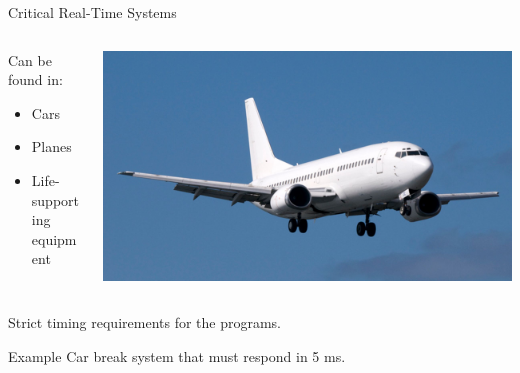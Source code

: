 \documentclass{beamer}
\begin{document}
\begin{frame}{Critical Real-Time Systems}
    \begin{columns}
        \begin{column}{0.5\textwidth}
            \begin{block}{Can be found in:}
                \begin{itemize}
                    \item Cars 
                    \item Planes
                    \item Life-supporting equipment
                \end{itemize}
            \end{block}
        \end{column}

        \begin{column}{0.5\textwidth}
            \includegraphics[width=\textwidth]{pic/plane.png}
        \end{column}
    \end{columns}

    \hfill \break
    \hfill \break

    Strict timing requirements for the programs.

    \begin{exampleblock}{Example}
        Car break system that must respond in 5 ms.
    \end{exampleblock}
    
\end{frame}

\end{document}
